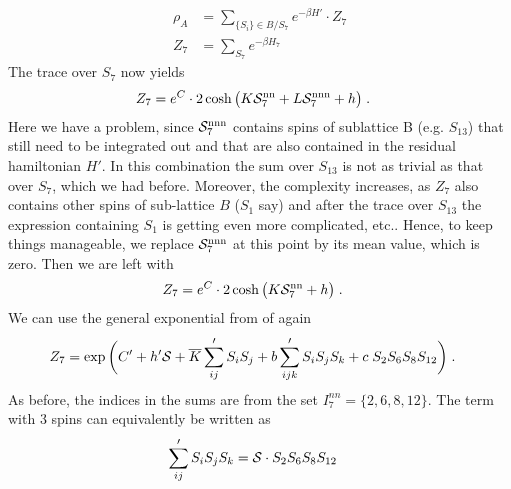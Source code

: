%
\begin{align*}
\rho_{A} &= \sum_{\{S_{i}\}\in B / S_{7}} e^{-\beta H'}\cdot Z_{7}\\
Z_{7} &= \sum_{S_{7}} e^{-\beta H_{7}}
\end{align*}
% 
The trace over $S_{7}$ now yields
%
\begin{align}\label{eq:Z:7}
Z_{7}&= e^{C} \cdot 2\cosh\big(K {\cal S}^\text{nn}_{7}  + L {\cal S}^\text{nnn}_{7} + h  \big)\;.
\end{align}
%
Here we have a problem, since ${\cal S}^\text{nnn}_{7}$ contains spins of sublattice B (e.g. $S_{13}$)
that still need to be integrated out and that are also contained in the   
residual hamiltonian  $H'$. In this combination the sum over $S_{13}$ is not as trivial as
that over $S_{7}$, which we had before. Moreover, the complexity increases, as $Z_{7}$
also contains other spins of sub-lattice $B$ ($S_{1}$ say) and after the trace over $S_{13}$ the expression containing $S_{1}$ is getting even more complicated, etc..
Hence, to keep things manageable, we replace  ${\cal S}^\text{nnn}_{7}$ at this point by its mean value, which is zero.
Then we are left with
%
\begin{align}\label{eq:Z:7b}
Z_{7}&= e^{C} \cdot 2\cosh\big(K {\cal S}^\text{nn}_{7}  + h  \big)\;.
\end{align}
%
We can use the general exponential from of  again
%
\begin{align*}
Z_{7} &= \exp\bigg(C' + h' {\cal S}+ \overline K \sum'_{ij}  S_{i}S_{j}  +
b \sum'_{ijk} S_{i}S_{j} S_{k}  + c \; S_{2}S_{6}S_{8}S_{12}\bigg)\;.
\end{align*}
%
As before, the indices in the sums are from the set $I^{nn}_{7} =\{2,6,8,12\}$.
The term with 3 spins can equivalently be written as
%
\begin{align*}
\sum'_{ij} S_{i}S_{j}S_{k}   &= {\cal S} \cdot  S_{2}S_{6}S_{8}S_{12} 
\end{align*}
%

